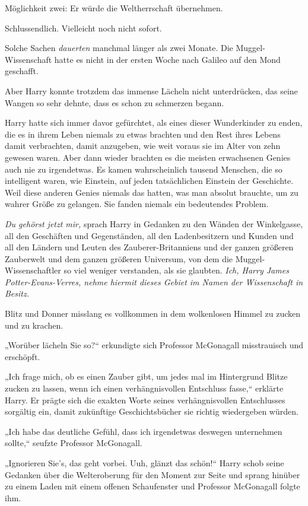 {Möglichkeit zwei: Er würde die Weltherrschaft übernehmen.

Schlussendlich. Vielleicht noch nicht sofort.

Solche Sachen \emph{dauerten} manchmal länger als zwei Monate. Die Muggel-Wissenschaft hatte es nicht in der ersten Woche nach Galileo auf den Mond geschafft.

Aber Harry konnte trotzdem das immense Lächeln nicht unterdrücken, das seine Wangen so sehr dehnte, dass es schon zu schmerzen begann.

Harry hatte sich immer davor gefürchtet, als eines dieser Wunderkinder zu enden, die es in ihrem Leben niemals zu etwas brachten und den Rest ihres Lebens damit verbrachten, damit anzugeben, wie weit voraus sie im Alter von zehn gewesen waren. Aber dann wieder brachten es die meisten erwachsenen Genies auch nie zu irgendetwas. Es kamen wahrscheinlich tausend Menschen, die so intelligent waren, wie Einstein, auf jeden tatsächlichen Einstein der Geschichte. Weil diese anderen Genies niemals das hatten, was man absolut brauchte, um zu wahrer Größe zu gelangen. Sie fanden niemals ein bedeutendes Problem.

\emph{Du gehörst jetzt mir,} sprach Harry in Gedanken zu den Wänden der Winkelgasse, all den Geschäften und Gegenständen, all den Ladenbesitzern und Kunden und all den Ländern und Leuten des Zauberer-Britanniens und der ganzen größeren Zauberwelt und dem ganzen größeren Universum, von dem die Muggel-Wissenschaftler so viel weniger verstanden, als sie glaubten. \emph{Ich, Harry James Potter-Evans-Verres, nehme hiermit dieses Gebiet im Namen der Wissenschaft in Besitz.}

Blitz und Donner misslang es vollkommen in dem wolkenlosen Himmel zu zucken und zu krachen.

„Worüber lächeln Sie so?“ erkundigte sich Professor McGonagall misstrauisch und erschöpft.

„Ich frage mich, ob es einen Zauber gibt, um jedes mal im Hintergrund Blitze zucken zu lassen, wenn ich einen verhängnisvollen Entschluss fasse,“ erklärte Harry. Er prägte sich die exakten Worte seines verhängnisvollen Entschlusses sorgältig ein, damit zukünftige Geschichtsbücher sie richtig wiedergeben würden.

„Ich habe das deutliche Gefühl, dass ich irgendetwas deswegen unternehmen sollte,“ seufzte Professor McGonagall.

„Ignorieren Sie's, das geht vorbei. Uuh, glänzt das schön!“ Harry schob seine Gedanken über die Welteroberung für den Moment zur Seite und sprang hinüber zu einem Laden mit einem offenen Schaufenster und Professor McGonagall folgte ihm.

}
